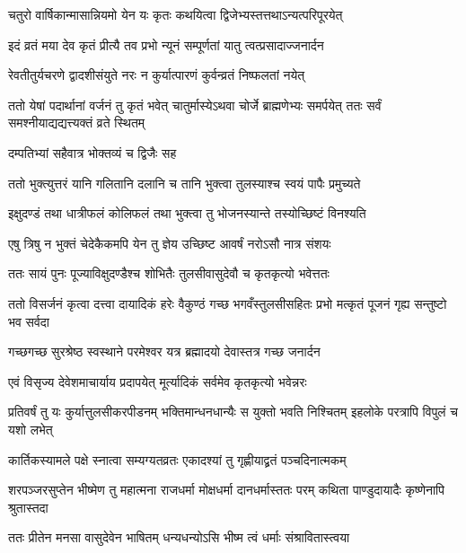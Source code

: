 \twolineshloka
{चतुरो वार्षिकान्मासान्नियमो येन यः कृतः}
{कथयित्वा द्विजेभ्यस्तत्तथाऽन्यत्परिपूरयेत्} %

\twolineshloka
{इदं व्रतं मया देव कृतं प्रीत्यै तव प्रभो}
{न्यूनं सम्पूर्णतां यातु त्वत्प्रसादाज्जनार्दन} %

\twolineshloka
{रेवतीतुर्यचरणे द्वादशीसंयुते नरः}
{न कुर्यात्पारणं कुर्वन्व्रतं निष्फलतां नयेत्} %

\threelineshloka
{ततो येषां पदार्थानां वर्जनं तु कृतं भवेत्}
{चातुर्मास्येऽथवा चोर्जे ब्राह्मणेभ्यः समर्पयेत्}
{ततः सर्वं समश्नीयाद्यद्यत्त्यक्तं व्रते स्थितम्} %


\onelineshloka
{दम्पतिभ्यां सहैवात्र भोक्तव्यं च द्विजैः सह} %

\twolineshloka
{ततो भुक्त्युत्तरं यानि गलितानि दलानि च}
{तानि भुक्त्वा तुलस्याश्च स्वयं पापैः प्रमुच्यते} %

\twolineshloka
{इक्षुदण्डं तथा धात्रीफलं कोलिफलं तथा}
{भुक्त्वा तु भोजनस्यान्ते तस्योच्छिष्टं विनश्यति} %

\twolineshloka
{एषु त्रिषु न भुक्तं चेदेकैकमपि येन तु}
{ज्ञेय उच्छिष्ट आवर्षं नरोऽसौ नात्र संशयः} %

\twolineshloka
{ततः सायं पुनः पूज्याविक्षुदण्डैश्च शोभितैः}
{तुलसीवासुदेवौ च कृतकृत्यो भवेत्ततः} %

\threelineshloka
{ततो विसर्जनं कृत्वा दत्त्वा दायादिकं हरेः}
{वैकुण्ठं गच्छ भगवँस्तुलसीसहितः प्रभो}
{मत्कृतं पूजनं गृह्य सन्तुष्टो भव सर्वदा} %

\twolineshloka
{गच्छगच्छ सुरश्रेष्ठ स्वस्थाने परमेश्वर}
{यत्र ब्रह्मादयो देवास्तत्र गच्छ जनार्दन} %

\twolineshloka
{एवं विसृज्य देवेशमाचार्याय प्रदापयेत्}
{मूर्त्यादिकं सर्वमेव कृतकृत्यो भवेन्नरः} %

\threelineshloka
{प्रतिवर्षं तु यः कुर्यात्तुलसीकरपीडनम्}
{भक्तिमान्धनधान्यैः स युक्तो भवति निश्चितम्}
{इहलोके परत्रापि विपुलं च यशो लभेत्} %





\twolineshloka
{कार्तिकस्यामले पक्षे स्नात्वा सम्यग्यतव्रतः}
{एकादश्यां तु गृह्णीयाद्व्रतं पञ्चदिनात्मकम्} %

\threelineshloka
{शरपञ्जरसुप्तेन भीष्मेण तु महात्मना}
{राजधर्मा मोक्षधर्मा दानधर्मास्ततः परम्}
{कथिता पाण्डुदायादैः कृष्णेनापि श्रुतास्तदा} %

\twolineshloka
{ततः प्रीतेन मनसा वासुदेवेन भाषितम्}
{धन्यधन्योऽसि भीष्म त्वं धर्माः संश्रावितास्त्वया} %

